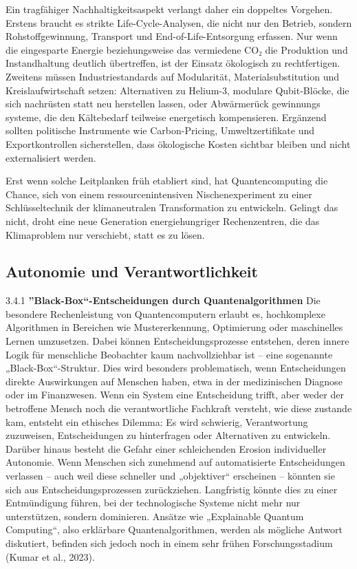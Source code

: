 Ein tragfähiger Nachhaltigkeitsaspekt verlangt daher ein doppeltes Vorgehen. Erstens braucht es strikte Life-Cycle-Analysen, die nicht nur den Betrieb, sondern Rohstoffgewinnung, Transport und End-of-Life-Entsorgung erfassen. Nur wenn die eingesparte Energie beziehungsweise das vermiedene CO₂ die Produktion und Instandhaltung deutlich übertreffen, ist der Einsatz ökologisch zu rechtfertigen. Zweitens müssen Industriestandards auf Modularität, Materialsubstitution und Kreislaufwirtschaft setzen: Alternativen zu Helium-3, modulare Qubit-Blöcke, die sich nachrüsten statt neu herstellen lassen, oder Abwärmerück gewinnungs systeme, die den Kältebedarf teilweise energetisch kompensieren. Ergänzend sollten politische Instrumente wie Carbon-Pricing, Umweltzertifikate und Exportkontrollen sicherstellen, dass ökologische Kosten sichtbar bleiben und nicht externalisiert werden. \cite{rootQuantumTechnologiesContext2025}

Erst wenn solche Leitplanken früh etabliert sind, hat Quantencomputing die Chance, sich von einem ressourcenintensiven Nischenexperiment zu einer Schlüsseltechnik der klimaneutralen Transformation zu entwickeln. Gelingt das nicht, droht eine neue Generation energiehungriger Rechenzentren, die das Klimaproblem nur verschiebt, statt es zu lösen.

\subsection{Autonomie und Verantwortlichkeit}

3.4.1 \textbf{”Black-Box“-Entscheidungen durch Quantenalgorithmen}
Die besondere Rechenleistung von Quantencomputern erlaubt es, hochkomplexe Algorithmen in Bereichen wie Mustererkennung, Optimierung oder maschinelles Lernen umzusetzen. Dabei können Entscheidungsprozesse entstehen, deren innere Logik für menschliche Beobachter kaum nachvollziehbar ist – eine sogenannte „Black-Box“-Struktur. Dies wird besonders problematisch, wenn Entscheidungen direkte Auswirkungen auf Menschen haben, etwa in der medizinischen Diagnose oder im Finanzwesen. Wenn ein System eine Entscheidung trifft, aber weder der betroffene Mensch noch die verantwortliche Fachkraft versteht, wie diese zustande kam, entsteht ein ethisches Dilemma: Es wird schwierig, Verantwortung zuzuweisen, Entscheidungen zu hinterfragen oder Alternativen zu entwickeln.
Darüber hinaus besteht die Gefahr einer schleichenden Erosion individueller Autonomie. Wenn Menschen sich zunehmend auf automatisierte Entscheidungen verlassen – auch weil diese schneller und „objektiver“ erscheinen – könnten sie sich aus Entscheidungsprozessen zurückziehen. Langfristig könnte dies zu einer Entmündigung führen, bei der technologische Systeme nicht mehr nur unterstützen, sondern dominieren. Ansätze wie „Explainable Quantum Computing“, also erklärbare Quantenalgorithmen, werden als mögliche Antwort diskutiert, befinden sich jedoch noch in einem sehr frühen Forschungsstadium (Kumar et al., 2023).

